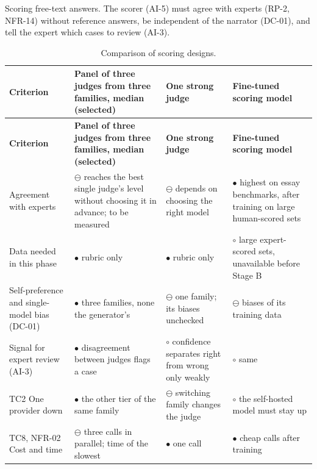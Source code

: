 Scoring free-text answers. The scorer (AI-5) must agree with experts (RP-2, NFR-14) without reference answers, be independent of the narrator (DC-01), and tell the expert which cases to review (AI-3).

{\small
\begin{longtable}{|>{\raggedright\arraybackslash}p{}|>{\raggedright\arraybackslash}p{}|>{\raggedright\arraybackslash}p{}|>{\raggedright\arraybackslash}p{}|}
\caption{Comparison of scoring designs.} \\
\hline
\textbf{Criterion} & \textbf{Panel of three judges from three families, median (selected)} & \textbf{One strong judge} & \textbf{Fine-tuned scoring model} \\ \hline
\endfirsthead
\hline
\textbf{Criterion} & \textbf{Panel of three judges from three families, median (selected)} & \textbf{One strong judge} & \textbf{Fine-tuned scoring model} \\ \hline
\endhead
Agreement with experts & $\ominus$ reaches the best single judge's level without choosing it in advance\cite{r123}; to be measured & $\ominus$ depends on choosing the right model & $\bullet$ highest on essay benchmarks\cite{r125}, after training on large human-scored sets \\ \hline
Data needed in this phase & $\bullet$ rubric only & $\bullet$ rubric only & $\circ$ large expert-scored sets, unavailable before Stage B \\ \hline
Self-preference and single-model bias (DC-01) & $\bullet$ three families, none the generator's\cite{r128} & $\ominus$ one family; its biases unchecked & $\ominus$ biases of its training data \\ \hline
Signal for expert review (AI-3) & $\bullet$ disagreement between judges flags a case & $\circ$ confidence separates right from wrong only weakly\cite{r117} & $\circ$ same \\ \hline
TC2 One provider down & $\bullet$ the other tier of the same family & $\ominus$ switching family changes the judge & $\circ$ the self-hosted model must stay up \\ \hline
TC8, NFR-02 Cost and time & $\ominus$ three calls in parallel; time of the slowest & $\bullet$ one call & $\bullet$ cheap calls after training \\ \hline
\end{longtable}
}

